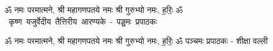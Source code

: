 \documentclass[17pt]{extarticle}
\begin{document}
\begin{titlepage}
    \begin{center}
 
\begin{sanskrit}
    { \Large
    ॐ नमः परमात्मने, श्री महागणपतये नमः
श्री गुरुभ्यो नमः, ह॒रिः॒ ॐ 
    }
    \\
    \vspace{2.5cm}
    \mbox{ \Huge
    कृष्ण यजुर्वेदीय तैत्तिरीय आरण्यके - पञ्चमः प्रपाठकः   }
\end{sanskrit}
\end{center}

\end{titlepage}
\tableofcontents

ॐ नमः परमात्मने, श्री महागणपतये नमः
श्री गुरुभ्यो नमः, ह॒रिः॒ ॐ      पञ्चमः प्रपाठकः - शीक्षा वल्ली \newline

\end{document}
